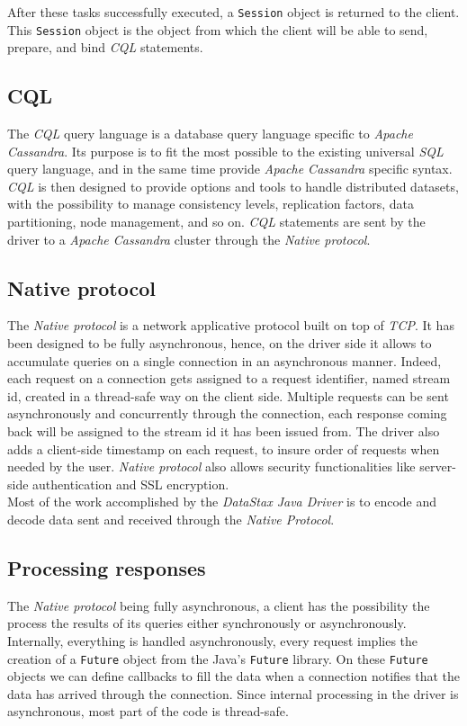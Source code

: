 \documentclass[a4paper]{report}
\newcommand{\djd}{\emph{DataStax Java Driver\xspace}}
\newcommand{\ca}{\emph{Apache Cassandra\xspace}}
\begin{document}
After these tasks successfully executed, a \verb;Session; object is returned to the client. This \verb;Session; object is the object from which the client will be able to send, prepare, and bind \emph{CQL} statements.

\subsection{CQL}
The \emph{CQL} query language is a database query language specific to \ca{}. Its purpose is to fit the most possible to the existing universal \emph{SQL} query language, and in the same time provide \ca{} specific syntax. \emph{CQL} is then designed to provide options and tools to handle distributed datasets, with the possibility to manage consistency levels, replication factors, data partitioning, node management, and so on. \emph{CQL} statements are sent by the driver to a \ca{} cluster through the \emph{Native protocol}.

\subsection{Native protocol}
The \emph{Native protocol} is a network applicative protocol built on top of \emph{TCP}. It has been designed to be fully asynchronous, hence, on the driver side it allows to accumulate queries on a single connection in an asynchronous manner. Indeed, each request on a connection gets assigned to a request identifier, named stream id, created in a thread-safe way on the client side. Multiple requests can be sent asynchronously and concurrently through the connection, each response coming back will be assigned to the stream id it has been issued from. The driver also adds a client-side timestamp on each request, to insure order of requests when needed by the user.
\emph{Native protocol} also allows security functionalities like server-side authentication and SSL encryption.\\
Most of the work accomplished by the \djd{} is to encode and decode data sent and received through the \emph{Native Protocol}.

\subsection{Processing responses}
The \emph{Native protocol} being fully asynchronous, a client has the possibility the process the results of its queries either synchronously or asynchronously. Internally, everything is handled asynchronously, every request implies the creation of a \verb;Future; object from the Java's \verb;Future; library. On these \verb;Future; objects we can define callbacks to fill the data when a connection notifies that the data has arrived through the connection. Since internal processing in the driver is asynchronous, most part of the code is thread-safe.
\end{document}
